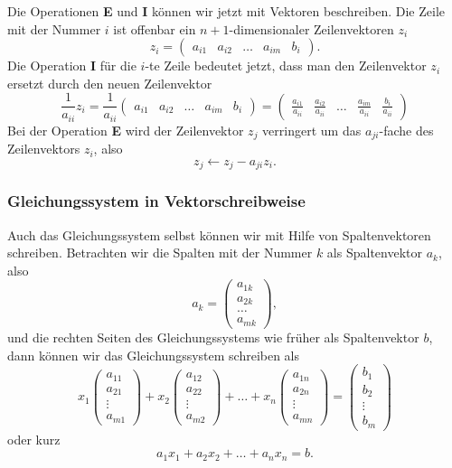 Die Operationen {\bf E} und {\bf I} können wir jetzt mit Vektoren
beschreiben.
Die Zeile mit der Nummer $i$ ist offenbar ein
$n+1$-dimensionaler Zeilenvektoren $z_i$
\[
z_i=\begin{pmatrix}a_{i1}&a_{i2}&\dots&a_{im}&b_i\end{pmatrix}.
\]
Die Operation {\bf I} für die $i$-te Zeile bedeutet jetzt, dass man
den Zeilenvektor $z_i$ ersetzt durch den neuen Zeilenvektor
\[
\frac1{a_{ii}}z_i
=
\frac1{a_{ii}}
\begin{pmatrix}a_{i1}&a_{i2}&\dots&a_{im}&b_i\end{pmatrix}
=
\begin{pmatrix}\frac{a_{i1}}{a_{ii}}&\frac{a_{i2}}{a_{ii}}&\dots&\frac{a_{im}}{a_{ii}}&\frac{b_i}{a_{ii}}\end{pmatrix}
\]
Bei der Operation {\bf E} wird der Zeilenvektor $z_j$
verringert um das $a_{ji}$-fache des Zeilenvektors $z_i$, also
\[
z_j \leftarrow z_j-a_{ji}z_i.
\]

\subsubsection{Gleichungssystem in Vektorschreibweise}
Auch das Gleichungssystem selbst können wir mit Hilfe von Spaltenvektoren
schreiben.
Betrachten wir die Spalten mit der Nummer $k$ als Spaltenvektor $a_k$,
also
\[
a_k=\begin{pmatrix}a_{1k}\\a_{2k}\\\dots\\a_{mk}\end{pmatrix},
\]
und die rechten Seiten des Gleichungssystems wie früher als Spaltenvektor $b$,
dann können wir das Gleichungssystem schreiben als
\[
x_1\begin{pmatrix}a_{11}\\a_{21}\\\vdots\\a_{m1}\end{pmatrix}
+
x_2\begin{pmatrix}a_{12}\\a_{22}\\\vdots\\a_{m2}\end{pmatrix}
+
\dots
+
x_n\begin{pmatrix}a_{1n}\\a_{2n}\\\vdots\\a_{mn}\end{pmatrix}
=
\begin{pmatrix}b_1\\b_2\\\vdots\\b_m\end{pmatrix}
\]
oder kurz
\[
a_1x_1+a_2x_2+\dots+a_nx_n=b.
\]

